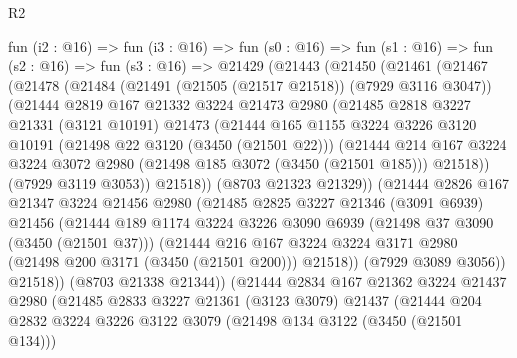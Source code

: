 \begin{lexlean}{R2}
\begin{coremodule}
  fun (i2 : @16) =>
  fun (i3 : @16) =>
  fun (s0 : @16) =>
  fun (s1 : @16) =>
  fun (s2 : @16) =>
  fun (s3 : @16) =>
  @21429
    (@21443
      (@21450
        (@21461
          (@21467
            (@21478
              (@21484
                (@21491 (@21505 (@21517 @21518)) (@7929 @3116 @3047))
                (@21444
                  @2819
                  @167
                  @21332
                  @3224
                  @21473
                  @2980
                  (@21485
                    @2818
                    @3227
                    @21331
                    (@3121 @10191)
                    @21473
                    (@21444
                      @165
                      @1155
                      @3224
                      @3226
                      @3120
                      @10191
                      (@21498 @22 @3120 (@3450 (@21501 @22)))
                      (@21444
                        @214
                        @167
                        @3224
                        @3224
                        @3072
                        @2980
                        (@21498 @185 @3072 (@3450 (@21501 @185)))
                        @21518))
                    (@7929 @3119 @3053))
                  @21518))
              (@8703 @21323 @21329))
            (@21444
              @2826
              @167
              @21347
              @3224
              @21456
              @2980
              (@21485
                @2825
                @3227
                @21346
                (@3091 @6939)
                @21456
                (@21444
                  @189
                  @1174
                  @3224
                  @3226
                  @3090
                  @6939
                  (@21498 @37 @3090 (@3450 (@21501 @37)))
                  (@21444
                    @216
                    @167
                    @3224
                    @3224
                    @3171
                    @2980
                    (@21498 @200 @3171 (@3450 (@21501 @200)))
                    @21518))
                (@7929 @3089 @3056))
              @21518))
          (@8703 @21338 @21344))
        (@21444
          @2834
          @167
          @21362
          @3224
          @21437
          @2980
          (@21485
            @2833
            @3227
            @21361
            (@3123 @3079)
            @21437
            (@21444
              @204
              @2832
              @3224
              @3226
              @3122
              @3079
              (@21498 @134 @3122 (@3450 (@21501 @134)))

\end{coremodule}
\end{lexlean}
